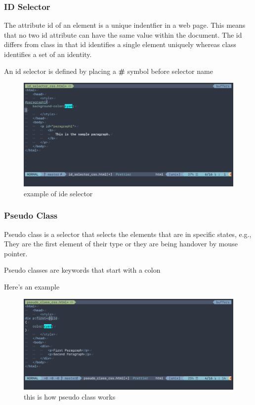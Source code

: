 \documentclass[a4paper,1pt,oneside]{article}
\begin{document}
\subsubsection{ID Selector}

The attribute id of an element is a unique indentfier in a web page. This means that no two id attribute can have the same value within the document. The id differs from class in that id identifies a single element uniquely whereas class identifies a set of an identity.

An id selector is defined by placing a \textbf{\#} symbol before selector name

\begin{figure}[hbt!]
	\centering
	\includegraphics[width=1\textwidth]{images/2020-03-23-233023_996x491_scrot.png}
	\caption{example of ide selector}
\end{figure}

\subsubsection{Pseudo Class}

Pseudo class is a selector that selects the elements that are in specific states, e.g., They are the first element of their type or they are being handover by mouse pointer.

Pseudo classes are keywords that start with a colon

Here's an example

\begin{figure}[hbt!]
	\centering
	\includegraphics[width=1\textwidth]{images/2020-03-23-230626_996x431_scrot.png}
	\caption{this is how pseudo class works}
\end{figure}
\end{document}
